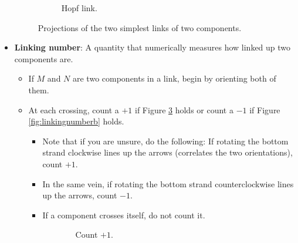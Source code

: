 \documentclass[titlepage]{article}
\numberwithin{figure}{section}
\numberwithin{table}{section}
\numberwithin{equation}{section}
\begin{document}
\begin{itemize}
\begin{figure}[h!]
\begin{subfigure}[b]{0.4\linewidth}
            \caption{Hopf link.}
            \label{fig:unlinkHopfb}
        \end{subfigure}
        \caption{Projections of the two simplest links of two components.}
        \label{fig:unlinkHopf}
    \end{figure}
    \item \textbf{Linking number}: A quantity that numerically measures how linked up two components are.
    \begin{itemize}
        \item If $M$ and $N$ are two components in a link, begin by orienting both of them.
        \item At each crossing, count a $+1$ if Figure \ref{fig:linkingnumbera} holds or count a $-1$ if Figure \ref{fig:linkingnumberb} holds.
        \begin{itemize}
            \item Note that if you are unsure, do the following: If rotating the bottom strand clockwise lines up the arrows (correlates the two orientations), count $+1$.
            \item In the same vein, if rotating the bottom strand counterclockwise lines up the arrows, count $-1$.
            \item If a component crosses itself, do not count it.
        \end{itemize}
        \begin{figure}[h!]
            \centering
            \begin{subfigure}[b]{0.2\linewidth}
                \centering
                \caption{Count $+1$.}
                \label{fig:linkingnumbera}
            \end{subfigure}
            \begin{subfigure}[b]{0.2\linewidth}

\end{subfigure}
\end{figure}
\end{itemize}
\end{itemize}
\end{document}

